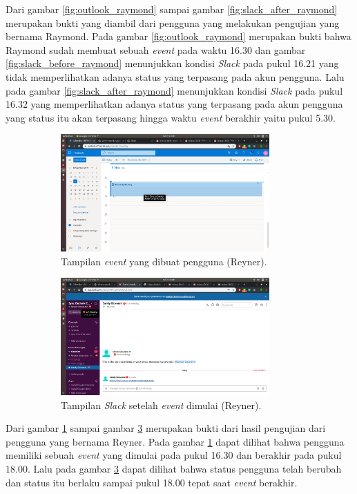 Dari gambar \ref{fig:outlook_raymond} sampai gambar \ref{fig:slack_after_raymond} merupakan bukti yang diambil dari pengguna yang melakukan pengujian yang bernama Raymond. Pada gambar \ref{fig:outlook_raymond} merupakan bukti bahwa Raymond sudah membuat sebuah \textit{event} pada waktu 16.30 dan gambar \ref{fig:slack_before_raymond} menunjukkan kondisi \textit{Slack} pada pukul 16.21 yang tidak memperlihatkan adanya status yang terpasang pada akun pengguna. Lalu pada gambar \ref{fig:slack_after_raymond} menunjukkan kondisi \textit{Slack} pada pukul 16.32 yang memperlihatkan adanya status yang terpasang pada akun pengguna yang status itu akan terpasang hingga waktu \textit{event} berakhir yaitu pukul 5.30. 

\begin{figure}[h]
\begin{subfigure}{8.5cm}
  \centering
  \includegraphics[width=8cm]{./Gambar/PengujianReyner/Outlook.png}
  \caption{Tampilan \textit{event} yang dibuat pengguna (Reyner).}
  \label{fig:outlook_reyner}
\end{subfigure}
\begin{subfigure}{8.5cm}
  \centering
  \includegraphics[width=8cm]{./Gambar/PengujianReyner/Slack_After.png}
  \caption{Tampilan \textit{Slack} setelah \textit{event} dimulai (Reyner).}
  \label{fig:slack_after_reyner}
\end{subfigure}
\caption{}
\end{figure}

Dari gambar \ref{fig:outlook_reyner} sampai gambar \ref{fig:slack_after_reyner} merupakan bukti dari hasil pengujian dari pengguna yang bernama Reyner. Pada gambar \ref{fig:outlook_reyner} dapat dilihat bahwa pengguna memiliki sebuah \textit{event} yang dimulai pada pukul 16.30 dan berakhir pada pukul 18.00. Lalu pada gambar \ref{fig:slack_after_reyner} dapat dilihat bahwa status pengguna telah berubah dan status itu berlaku sampai pukul 18.00 tepat saat \textit{event} berakhir. 

